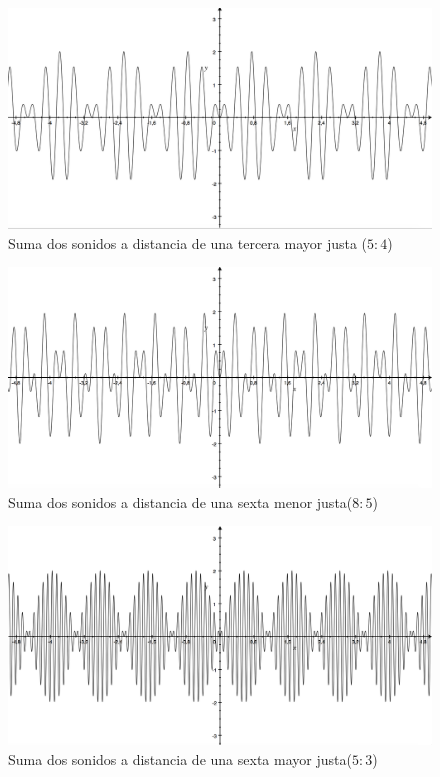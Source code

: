 \documentclass[11pt,a4paper]{article}
\begin{document}
	\begin{figure}[h]
		\centering	
		\includegraphics[scale=.35]{TerceraMayor}
		\caption{Suma dos sonidos a distancia de una tercera mayor justa ($5:4$)}
	\end{figure}
	
	\begin{figure}[h]
		\centering	
		\includegraphics[scale=.35]{SextaMenor}
		\caption{Suma dos sonidos a distancia de una sexta menor justa($8:5$)}
	\end{figure}
	
	\begin{figure}[h]
		\centering	
		\includegraphics[scale=.35]{SextaMayor2}
		\caption{Suma dos sonidos a distancia de una sexta mayor justa($5:3$)}
	\end{figure}
	
\end{document}
